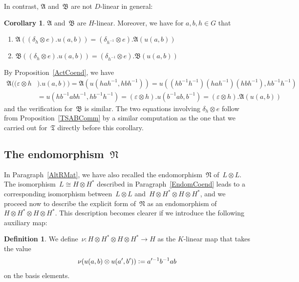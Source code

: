 \documentclass[12pt]{article}
\makeatletter
\newcounter{num}
\theoremstyle{definition}
\newtheorem{Cor}[Satz]{Corollary}
\newtheorem{Definition}[Satz]{Definition}
\theoremstyle{break}
\renewenvironment{proof}[1][\proofname]{\par
\vspace{-5pt}%
\pushQED{\qed}%
\normalfont
\topsep0pt \partopsep0pt %
\trivlist
\item[\hskip\labelsep
\bfseries
#1\@addpunct{.}]\ignorespaces
}{%
\popQED\endtrivlist\@endpefalse
\addvspace{6pt plus 6pt} %
}
\newcommand{\fA}{\mathfrak{A}}
\newcommand{\fB}{\mathfrak{B}}
\newcommand{\fT}{\mathfrak{T}}
\newcommand{\fN}{\mathfrak{N}}
\renewcommand{\1}{\mathbbm{1}}
\newcommand{\ot}{\mathbin{\otimes}}
\newcommand{\uu}{u}
\newcommand{\n}{\nu}
\newcommand{\deq}{\vcentcolon =}
\makeatother
\begin{document}
In contrast, $\fA$ and~$\fB$ are not $D$-linear in general:
\begin{Cor} \label{ABLin}
$\fA$ and~$\fB$ are $H$-linear. Moreover, we have for $a,b,h \in G$ that
\begin{enumerate}
\item
$\fA((\delta_{h} \ot e).u(a,b)) = (\delta_{h^{-1}} \ot e).\fA(u(a,b))$

\item
$\fB((\delta_{h} \ot e).u(a,b)) = (\delta_{h^{-1}} \ot e).\fB(u(a,b))$
\end{enumerate}
\end{Cor}
\begin{proof}
By Proposition~\ref{ActCoend}, we have
\begin{align*}
\fA((\varepsilon \ot h&).u(a,b)) = \fA(u(h a h^{-1}, h b h^{-1}))
= u((h b^{-1} h^{-1}) (h a h^{-1}) (h b h^{-1}), h b^{-1} h^{-1}) \\
&= u(h b^{-1} a b h^{-1}, h b^{-1} h^{-1})
= (\varepsilon \ot h).u(b^{-1} a b, b^{-1})
= (\varepsilon \ot h).\fA(u(a,b))
\end{align*}
and the verification for~$\fB$ is similar. The two equations involving $\delta_{h} \ot e$
follow from Proposition~\ref{TSABComm} by a similar computation as the one that we carried out for~$\fT$ directly before this corollary.
\end{proof}


\subsection{The endomorphism~$\fN$} \label{EndomN}
In Paragraph~\ref{AltRMat}, we have also recalled the endomorphism~$\fN$ of~$L \ot L$. The isomorphism~$L \cong H \ot H^*$ described in Paragraph~\ref{EndomCoend} leads to a corresponding isomorphism between~$L \ot L$ and~$H \ot H^* \ot H \ot H^*$, and we proceed now to describe the explicit form of~$\fN$ as an endomorphism of~$H \ot H^* \ot H \ot H^*$. This description becomes clearer if we introduce the following auxiliary map:
\begin{Definition}
We define~$\n \colon H \ot H^* \ot H \ot H^* \to H$ as the $K$-linear map that takes the value
\[\n(\uu(a,b) \ot \uu(a',b')) \deq a'^{-1} b^{-1} a b \]
on the basis elements.
\end{Definition}
\end{document}
